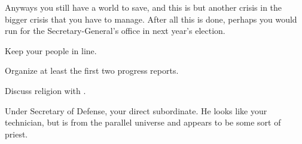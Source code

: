 \documentclass[char]{guildcamp3}
\begin{document}
Anyways you still have a world to save, and this is but another crisis in the bigger crisis that you have to manage. After all this is done, perhaps you would run for the Secretary-General's office in next year's election.

\begin{itemz}[Goals]
  \item Keep your people in line.
  \item Organize at least the first two progress reports.
  \item Discuss religion with \cPaladin{}.
\end{itemz}


\begin{contacts}
  \contact{\cPoliOne{}} Under Secretary of Defense, your direct subordinate.
  \contact{\cPaladin{}} He looks like your technician, but is from the parallel universe and appears to be some sort of priest.
\end{contacts}
\end{document}
